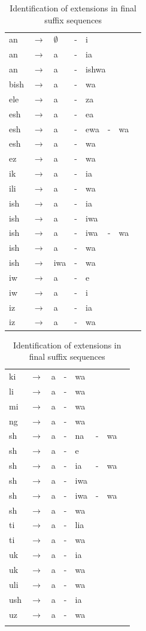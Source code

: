 \documentclass[output=paper,colorlinks,citecolor=brown]{langscibook}
\begin{document}
 
\begin{table}
\begin{minipage}[b]{.5\linewidth}
\begin{tabular}{llllllll}
\lsptoprule
an & $\to$ &$\emptyset$ &-& i \\
an & $\to$ & a&-& ia  \\
an & $\to$ & a&-& \multicolumn{2}{l}{ishwa}  \\
bish & $\to$ &  a&-& wa \\
ele  & $\to$ &a&-& za \\
esh  & $\to$ &a&-& ea \\
esh  & $\to$ &a &-& ewa &-& wa \\
esh  & $\to$ &a&-& wa  \\
ez  & $\to$ &a&-& wa \\
ik  & $\to$ &a&-& ia  \\
ili  & $\to$ &a &-&wa \\
ish   & $\to$ &a &-&ia  \\
ish  & $\to$ &a &-&iwa  \\
ish  & $\to$ &a &-&iwa &-&wa \\
ish  & $\to$ &a &-&wa \\
ish  & $\to$ &iwa&-& wa \\	
iw  & $\to$ &a &-&e \\
iw  & $\to$ & a &-&i  \\
iz  & $\to$ &a &-&ia  \\
iz  & $\to$ &a  &-&   wa \\
\end{tabular}
 \end{minipage}
\begin{minipage}[b]{.4\linewidth}
\begin{tabular}{llllllll}
ki  & $\to$ &a  &-&   wa  \\
li  & $\to$ &a  &-&   wa \\
mi  & $\to$ &a   &-&  wa \\
ng  & $\to$ &a  &-&   wa  \\
sh  & $\to$ &a  &-&   na &-&  wa  \\
sh  & $\to$ &a  &-&   e  \\
sh  & $\to$ &a   &-&  ia  &-& wa \\
sh  & $\to$ &a   &-&  iwa \\
sh  & $\to$ &a   &-&  iwa &-&  wa  \\	
sh  & $\to$ &a  &-&   wa \\
ti  & $\to$ &a  &-&   lia \\
ti  & $\to$ &a  &-&   wa \\
uk  & $\to$ &a  &-&   ia \\
uk & $\to$ &a  &-&   wa \\
uli  & $\to$ &a &-&    wa \\
ush  & $\to$ &a  &-&  ia \\
uz  & $\to$ &a  &-&   wa \\
 \lspbottomrule
\end{tabular}
 \end{minipage}
\caption{Identification of extensions in final suffix sequences}
 \label{finalstructure}
\end{table}
\end{document}

